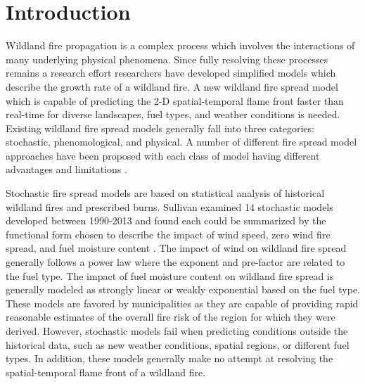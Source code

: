 \documentclass[smallcondensed]{svjour3}     %
\begin{document}
\section{Introduction}
\label{intro}

Wildland fire propagation is a complex process which involves the
interactions of many underlying physical phenomena. Since fully
resolving these processes remains a research effort researchers
have developed simplified models which describe the growth rate
of a wildland fire.
A new wildland fire spread model which is capable of predicting the 2-D
spatial-temporal flame front faster than real-time for diverse landscapes,
fuel types, and weather conditions is needed.
Existing wildland fire spread models generally fall into three
categories: stochastic, phenomological, and physical.
A number of different fire spread model approaches have been
proposed with each class of model having different advantages and limitations
\cite{weber1991modelling,sullivan2007a,sullivan2007b}.

Stochastic fire spread models are based on statistical analysis of
historical wildland fires and prescribed burns. Sullivan examined 14
stochastic models developed between 1990-2013 and found each could be
summarized by the functional form chosen to describe the impact of wind speed,
zero wind fire spread, and fuel moisture content \cite{sullivan2007b}.
The impact of wind on wildland fire spread generally follows a power law
where the exponent and pre-factor are related to the fuel type. The
impact of fuel moisture content on wildland fire spread is generally
modeled as strongly linear or weakly exponential based on the fuel type.
These models are favored by municipalities as they are capable of
providing rapid reasonable estimates of the overall fire risk of the
region for which they were derived. However, stochastic models fail when
predicting conditions outside the historical data, such as new weather
conditions, spatial regions, or different fuel types. In addition, these
models generally make no attempt at resolving the spatial-temporal flame
front of a wildland fire.
\end{document}
